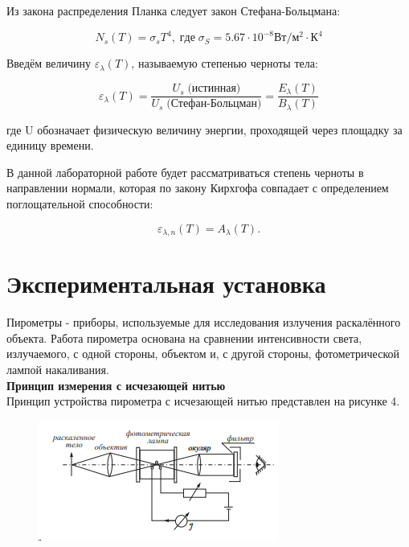 \documentclass[12pt,a4paper]{article}
\begin{document}
	Из закона распределения Планка следует закон Стефана-Больцмана:
	
\begin{equation}
	N_s(T) = \sigma_s T^4, \; где \; \sigma_S = 5.67 \cdot 10^{-8} Вт/м^2 \cdot К^4
\end{equation}

Введём величину $\varepsilon_{\lambda}(T)$, называемую степенью черноты тела:

\begin{equation}
	\varepsilon_{\lambda}(T) = \frac{U_s \; \text{(истинная)}}{U_s \; \text{(Стефан-Больцман)}} = 
	\frac{E_\lambda(T)}{B_\lambda(T)}
\end{equation}

где U обозначает физическую величину энергии, проходящей через площадку за единицу времени.

В данной лабораторной работе будет рассматриваться  степень черноты в направлении нормали, которая по закону Кирхгофа совпадает с определением поглощательной способности: 

\begin{equation}
	\varepsilon_{\lambda, n}(T) = A_\lambda(T).
\end{equation}  


	
	\section{Экспериментальная установка}
	
	Пирометры - приборы, используемые для исследования излучения раскалённого объекта.
	Работа пирометра основана на сравнении интенсивности света, излучаемого, с одной стороны, объектом и, с другой стороны, фотометрической лампой накаливания.\\
	
	\textbf{Принцип измерения с исчезающей нитью}\\
	Принцип устройства пирометра с исчезающей нитью представлен на рисунке 4.
	
	\begin{figure}[H]
		\centering
		\includegraphics[scale=1.5]{4}
		\caption{}
		\label{fig:4}
	\end{figure}
\end{document}
